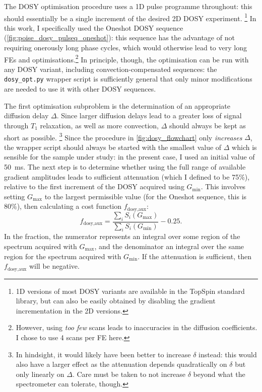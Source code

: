 The DOSY optimisation procedure uses a 1D pulse programme throughout: this should essentially be a single increment of the desired 2D DOSY experiment.%
\footnote{1D versions of most DOSY variants are available in the TopSpin standard library, but can also be easily obtained by disabling the gradient incrementation in the 2D versions.}
In this work, I specifically used the Oneshot DOSY sequence\autocite{Pelta2002MRC} (\cref{fig:poise_dosy_pulseq_oneshot}): this sequence has the advantage of not requiring onerously long phase cycles, which would otherwise lead to very long FEs and optimisations.\footnote{However, using \textit{too few} scans leads to inaccuracies in the diffusion coefficients.\autocite{Pelta2002MRC} I chose to use 4 scans per FE here.}
In principle, though, the optimisation can be run with any DOSY variant, including convection-compensated sequences\autocite{Jerschow1997JMR,Sorland2000JMR,Nilsson2005JMR}: the \texttt{dosy\_opt.py} wrapper script is sufficiently general that only minor modifications are needed to use it with other DOSY sequences.

The first optimisation subproblem is the determination of an appropriate diffusion delay $\Delta$.
Since larger diffusion delays lead to a greater loss of signal through $T_1$ relaxation, as well as more convection\autocite{Swan2015JMR}, $\Delta$ should always be kept as short as possible.%
\footnote{In hindsight, it would likely have been better to increase $\delta$ instead: this would also have a larger effect as the attenuation depends quadratically on $\delta$ but only linearly on $\Delta$. Care must be taken to not increase $\delta$ beyond what the spectrometer can tolerate, though.}
Since the procedure in \cref{fig:dosy_flowchart} only \textit{increases} $\Delta$, the wrapper script should always be started with the smallest value of $\Delta$ which is sensible for the sample under study: in the present case, I used an initial value of \qty{50}{\ms}.
The next step is to determine whether using the full range of available gradient amplitudes leads to sufficient attenuation (which I defined to be 75\%), relative to the first increment of the DOSY acquired using $G_\text{min}$.
This involves setting $G_\text{max}$ to the largest permissible value (for the Oneshot sequence, this is 80\%), then calculating a cost function $f_\text{dosy,aux}$:
\begin{equation}
    \label{eq:dosy_aux_cf}
    f_\text{dosy,aux} = \frac{\sum_i S_i(G_\text{max})}{\sum_i S_i(G_\text{min})} - 0.25.
\end{equation}
In the fraction, the numerator represents an integral over some region of the spectrum acquired with $G_\text{max}$, and the denominator an integral over the same region for the spectrum acquired with $G_\text{min}$.
If the attenuation is sufficient, then $f_\text{dosy,aux}$ will be negative.

